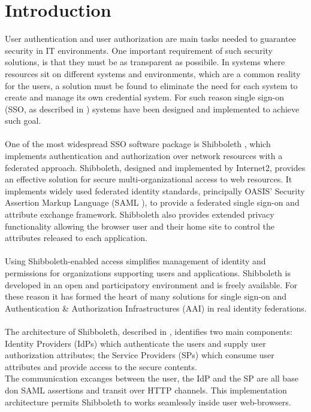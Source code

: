 \label{sec:introduction}
\section{Introduction}
User authentication and user authorization are main tasks needed to guarantee security in IT environments.
One important requirement of such security solutions, is that they must be as transparent as possibile.
In systems where resources sit on different systems and environments, which are a common reality for the users, a solution must be found to eliminate the need for each system
to create and manage its own credential system.
For such reason single sign-on (SSO, as described in \cite{Shaer-1995}) systems have been designed and implemented to achieve such goal.\\
\\
One of the most widespread SSO software package is Shibboleth \cite{Morgan-2004}, which implements authentication and authorization over network resources with a federated
approach.
Shibboleth, designed and implemented by Internet2, provides an effective solution for secure multi-organizational access to web resources.
It implements widely used federated identity standards, principally OASIS' Security Assertion Markup Language (SAML \cite{Cantor-2005}), to provide a federated single
sign-on and attribute exchange framework.
Shibboleth also provides extended privacy functionality allowing the browser user and their home site to control the attributes released to each application.\\
\\
Using Shibboleth-enabled access simplifies management of identity and permissions for organizations supporting users and applications.
Shibboleth is developed in an open and participatory environment and is freely available.
For these reason it has formed the heart of many solutions for single sign-on and Authentication \& Authorization Infrastructures (AAI) in real identity federations.\\
\\
The architecture of Shibboleth, described in \cite{Erdos-2005}, identifies two main components: Identity Providers (IdPs) which authenticate the users and supply user 
authorization attributes; the Service Providers (SPs) which consume user attributes and provide access to the secure contents.\\
The communication excanges between the user, the IdP and the SP are all base don SAML assertions and transit over HTTP channels.
This implementation architecture permits Shibboleth to works seamlessly inside user web-browsers.
